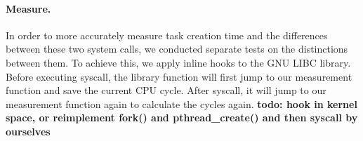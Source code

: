 \paragraph{Measure.} In order to more accurately measure task creation time and the differences between these two system calls, we conducted separate tests on the distinctions between them. To achieve this, we apply inline hooks to the GNU LIBC library. Before executing syscall, the library function will first jump to our measurement function and save the current CPU cycle. After syscall, it will jump to our measurement function again to calculate the cycles again. \textbf{todo: hook in kernel space, or reimplement fork() and pthread\_create() and then syscall by ourselves}